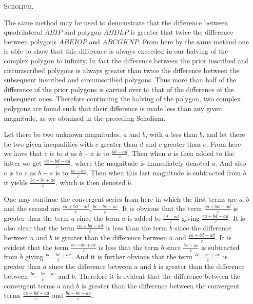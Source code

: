 \documentclass[11pt,letterpaper]{book}
\begin{document}
\begin{samepage}
\begin{center}
\large\textsc{Scholium.}
\end{center}

The same method may be used to demonstrate that the difference
between quadrilateral $ABIP$ and polygon $ABDLP$ is greater that twice the
difference between polygons $ABEIOP$ and $ABCGKNP$. From here by the same method
one is able to show that this difference is always exceeded in our halving
of the complex polygon to infinity. In fact the difference between the prior
inscribed and circumscribed polygons is always greater than twice the difference
between the subsequent inscribed and circumscribed polygons. Thus more than half
of the difference of the prior polygons is carried over to that of the
difference of the subsequent ones. Therefore continuing the halving of the
polygon, two complex polygons are found such that their difference is made
less than any given magnitude, as we obtained in the preceding Scholium.
\end{samepage}

Let there be two unknown magnitudes, $a$ and $b$, with $a$ less than $b$, and
let there be two given inequalities with $c$ greater than $d$ and $c$ 
greater than $e$. From here we have that $c$ is to $d$ as $b - a$ is to
$\frac{bd - ad}{c}$.  Then when $a$ is then added to the latter we get
$\frac{ca + bd - ad}{c}$, where the magnitude is immediately denoted $a$.
And also $c$ is to $e$ as $b - a$ is to $\frac{be - ae}{c}$. Then when this last
magnitude is subtracted from $b$ it yields $\frac{bc - be + ae}{c}$, which is
then denoted $b$.

One may continue the convergent series from here in which the first terms are
$a, b$ and the second are $\frac{ca+bd-ad}{c}, \frac{bc-be+ae}{c}$. It is
obvious that the term $\frac{ca+bd-ad}{c}$ is greater than the term $a$ since
the term $a$ is added to $\frac{bd-ad}{c}$ giving $\frac{ca+bd-ad}{c}$. It is
also clear that the term $\frac{ca+bd-ad}{c}$ is less than the term $b$ since the
difference between $a$ and $b$ is greater than the difference between $a$ and
$\frac{ca+bd-ad}{c}$. It is evident that the term $\frac{bc-be+ae}{c}$ is less
that the term $b$ since $\frac{be-ae}{c}$ is subtracted from $b$ giving
$\frac{bc-be+ae}{c}$. And it is further obvious that the term
$\frac{bc-be+ae}{c}$ is greater than $a$ since the difference between $a$ and
$b$ is greater than the difference between $\frac{bc-be+ae}{c}$ and $b$.
Therefore it is evident that the difference between the convergent terms $a$ and
$b$ is greater than the difference between the convergent terms
$\frac{ca+bd-ad}{c}$ and $\frac{bc-be+ae}{c}$.
\end{document}
